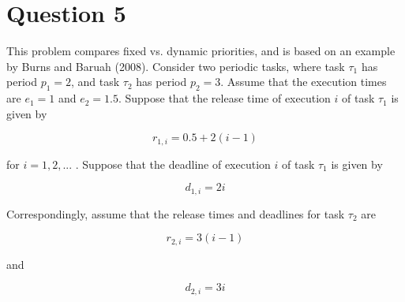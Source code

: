 \documentclass[12pt]{article}
\begin{document}
\section{Question 5}
This problem compares fixed vs. dynamic priorities, and is based on an example by
Burns and Baruah (2008). Consider two periodic tasks, where task $\tau_1$ has period
$p_1 = 2$, and task $\tau_2$ has period $p_2 = 3$. Assume that the execution times are $e_1 = 1$ and $e_2 = 1.5$. Suppose that the release time of execution $i$ of task $\tau_1$ is given by

$$ r_{1,i}=0.5+2(i-1) $$

for $i = 1, 2, ...$ . Suppose that the deadline of execution $i$ of task $\tau_1$ is given by

$$ d_{1,i}=2i $$

Correspondingly, assume that the release times and deadlines for task $\tau_2$ are

$$ r_{2,i}=3(i-1) $$

and

$$ d_{2,i}=3i $$
\end{document}
